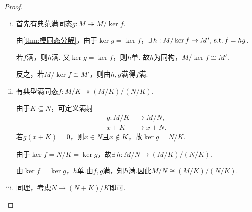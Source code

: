 \begin{proof}
    \begin{enumerate}[(i)]
        \item 首先有典范满同态$g: M \twoheadrightarrow M / \ker f$.\par
        由\cref{thm:模同态分解}，由于$\ker g = \ker f$，$\exists\, h: M / \ker f \to M',\operatorname{\,\text{s.t.}} f = hg$.\par
        
        若$f$满，则$h$满.
        又$\ker g = \ker f$，则$h$单.
        故$h$为同构，$M / \ker f \cong M'$.\par
        反之，若$M / \ker f \cong M'$，则由$h, g$满得$f$满.
        \item 有典型满同态$f: M/K \twoheadrightarrow (M/K)/(N/K)$.\par
        由于$K \subseteq N$，可定义满射
        \begin{align*}
            g: M/K &\to M/N, \\[-7pt]
            x+K &\mapsto x+N.
        \end{align*}
        若$g(x+K) = 0$，则$x \in N$且$x \notin K$，故$\ker g = N/K$.\par
        由于$\ker f = N/K = \ker g$，故$\exists\, h: M/N \to (M/K) / (N/K)$.\par
        由$\ker f = \ker g$，$h$单.由$f, g$满，知$h$满.因此$M/N \cong (M/K) / (N/K)$.
        \item 同理，考虑$N \to (N+K)/K$即可. \qedhere
    \end{enumerate}
    \begin{figure}[H]
        \centering
        \renewcommand{\thesubfigure}{\roman{subfigure}}
        \hspace{-0.1\textwidth}
        \begin{subfigure}[b]{0.2\linewidth}
            \centering
        \end{subfigure}
        \hspace{0.05\linewidth}
        \begin{subfigure}[b]{0.28\linewidth}
            \centering
            \begin{tikzcd}[labels={font=\normalsize}]

\end{tikzcd}
\end{subfigure}
\end{figure}
\end{proof}
